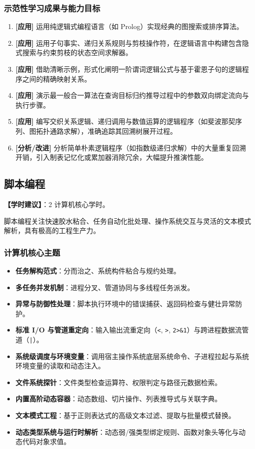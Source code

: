\subsubsection{示范性学习成果与能力目标}
\begin{enumerate}
    \item \textbf{[应用]} 运用纯逻辑式编程语言（如 Prolog）实现经典的图搜索或排序算法。
    \item \textbf{[应用]} 运用子句事实、递归关系规则与剪枝操作符，在逻辑语言中构建包含隐式搜索与约束剪枝的状态空间求解器。
    \item \textbf{[应用]} 借助清晰示例，形式化阐明一阶谓词逻辑公式与基于霍恩子句的逻辑程序之间的精确映射关系。
    \item \textbf{[应用]} 演示最一般合一算法在查询目标归约推导过程中的参数双向绑定流向与执行步骤。
    \item \textbf{[应用]} 编写交织关系逻辑、递归调用与数值运算的逻辑程序（如斐波那契序列、图拓扑通路求解），准确追踪其回溯树展开过程。
    \item \textbf{[分析/改进]} 分析简单朴素逻辑程序（如指数级递归求解）中的大量重复回溯开销，引入制表记忆化或累加器消除冗余，大幅提升推演性能。
\end{enumerate}

\subsection{脚本编程}
\textbf{【学时建议】}：2 计算机核心学时。

脚本编程关注快速胶水粘合、任务自动化批处理、操作系统交互与灵活的文本模式解析，具有极高的工程生产力。

\subsubsection{计算机核心主题}
\begin{itemize}
    \item \textbf{任务解构范式}：分而治之、系统构件粘合与规约处理。
    \item \textbf{多任务并发机制}：进程分叉、管道协同与多线程任务派发。
    \item \textbf{异常与防御性处理}：脚本执行环境中的错误捕获、返回码检查与健壮异常防护。
    \item \textbf{标准 I/O 与管道重定向}：输入输出流重定向（\texttt{<}, \texttt{>}, \texttt{2>\&1}）与跨进程数据流管道（\texttt{|}）。
    \item \textbf{系统级调度与环境变量}：调用宿主操作系统底层系统命令、子进程拉起与系统环境变量的读取和动态注入。
    \item \textbf{文件系统探针}：文件类型检查运算符、权限判定与路径元数据检索。
    \item \textbf{内置高阶动态容器}：动态数组、切片操作、列表推导式与关联字典。
    \item \textbf{文本模式工程}：基于正则表达式的高级文本过滤、提取与批量模式替换。
    \item \textbf{动态类型系统与运行时解析}：动态弱/强类型绑定规则、函数对象头等化与动态代码对象求值。
\end{itemize}

